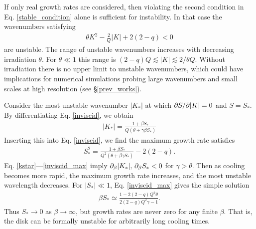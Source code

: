 
If only real growth rates are considered, then violating the second
condition in Eq. \ref{stable_condition} alone is sufficient for instability. 
In that case the wavenumbers satisfying
\begin{align}
  \theta K^2 - \frac{2}{Q}|K| + 2(2-q) < 0 
\end{align}
are unstable. The range of unstable wavenumbers
increases with decreasing irradiation $\theta$. For $\theta\ll 1$ this range is 
$(2-q)Q\lesssim|K|\lesssim2/\theta Q$. Without irradiation there is no
upper limit to unstable wavenumbers, which could have implications for
numerical simulations probing large wavenumbers and small scales 
at high resolution (see \S\ref{prev_works}). 

Consider the most unstable wavenumber $|K_*|$ at which $\partial S/\partial|K| =
0$ and $S = S_*$. By differentiating Eq. \ref{inviscid}, we obtain 
\begin{align}\label{kstar}
  |K_*| = \frac{1+\beta S_*}{Q\left(\theta + \gamma \beta S_*\right)}
\end{align}
Inserting this into Eq. \ref{inviscid}, we find the maximum growth
rate satisfies
\begin{align}\label{inviscid_max}
  S_*^2 = \frac{1+\beta S_*}{Q^2\left(\theta + \beta\gamma S_*\right)}
  - 2(2-q).
\end{align}
Eq. \ref{kstar}---\ref{inviscid_max} imply $\partial_\beta|K_*|,\,\partial_\beta
S_*<0 $ for $\gamma>\theta$. Then as cooling becomes more rapid, the maximum 
growth rate increases, and the most unstable wavelength decreases. 
For $|S_*|\ll1$, Eq. \ref{inviscid_max} gives the simple solution 
\begin{align}
  \beta S_*\simeq \frac{1-2(2-q)Q^2\theta}{2(2-q)Q^2\gamma-1}.  
\end{align} 
Thus $S_*\to0$ as $\beta\to\infty$, but growth rates are never zero
for any finite $\beta$. That is, the disk can be formally unstable for
arbitrarily long cooling times.     
 
